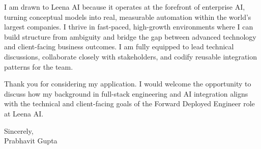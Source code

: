 \documentclass[11pt,a4paper]{article}
\begin{document}
I am drawn to Leena AI because it operates at the forefront of enterprise AI, turning conceptual models into real, measurable automation within the world's largest companies. I thrive in fast-paced, high-growth environments where I can build structure from ambiguity and bridge the gap between advanced technology and client-facing business outcomes. I am fully equipped to lead technical discussions, collaborate closely with stakeholders, and codify reusable integration patterns for the team. 

Thank you for considering my application. I would welcome the opportunity to discuss how my background in full-stack engineering and AI integration aligns with the technical and client-facing goals of the Forward Deployed Engineer role at Leena AI.

\vspace{2em}
Sincerely,\\
\vspace{1em}
Prabhavit Gupta
\end{document}
